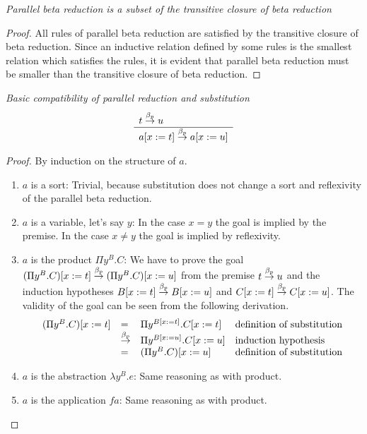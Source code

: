 \begin{lemma}
    \label{ParallelReductionLeReductionStar}
    \emph{Parallel beta reduction is a subset of the transitive closure of beta
    reduction}

    \begin{proof}
        All rules of parallel beta reduction are satisfied by the transitive
        closure of beta reduction. Since an inductive relation defined by some
        rules is the smallest relation which satisfies the rules, it is evident
        that parallel beta reduction must be smaller than the transitive closure
        of beta reduction.
    \end{proof}
\end{lemma}







\begin{lemma}
    \label{ParallelReductionSubstitution1}
    \emph{Basic compatibility of parallel reduction and substitution}
    $$
    \begin{array}{l} 
        t \stackrel{\beta_p}{\to} u
     \\ \hline 
        a[x:=t] \stackrel{\beta_p}{\to} a[x:=u]
    \end{array}
    $$

    \begin{proof}
    By induction on the structure of $a$.
    \begin{enumerate}
    \item $a$ is a sort: Trivial, because substitution does not change a sort
    and reflexivity of the parallel beta reduction.

    \item $a$ is a variable, let's say $y$: In the case $x=y$ the goal is
    implied by the premise. In the case $x \ne y$ the goal is implied by
    reflexivity.

    \item $a$ is the product $\Pi y^B. C$: We have to prove the goal
    $(\Pi y^B. C)[x:=t] \stackrel{\beta_p}{\to} (\Pi y^B.C)[x:=u]$ from the premise $t \stackrel{\beta_p}{\to}
    u$ and the induction hypotheses  $B[x:=t] \stackrel{\beta_p}{\to} B[x:=u]$ and
    $C[x:=t] \stackrel{\beta_p}{\to} C[x:=u]$. The validity of the goal can be seen from the
    following derivation.
    $$
    \begin{array}{lllll}
        (\Pi y^B. C)[x:=t]
        &=& \Pi y^{B[x:=t]}. C[x:=t]
        &\text{definition of substitution}
        \\
        &\stackrel{\beta_p}{\to}& \Pi y^{B[x:=u]}. C[x:=u]
        &\text {induction hypothesis}
        \\
        &=& (\Pi y^B. C)[x:=u]
        &\text{definition of substitution}
    \end{array}
    $$

    \item $a$ is the abstraction $\lambda y^B. e$: Same reasoning as with
    product.

    \item $a$ is the application $f a$: Same reasoning as with
    product.
    \end{enumerate}
    \end{proof}
\end{lemma}


